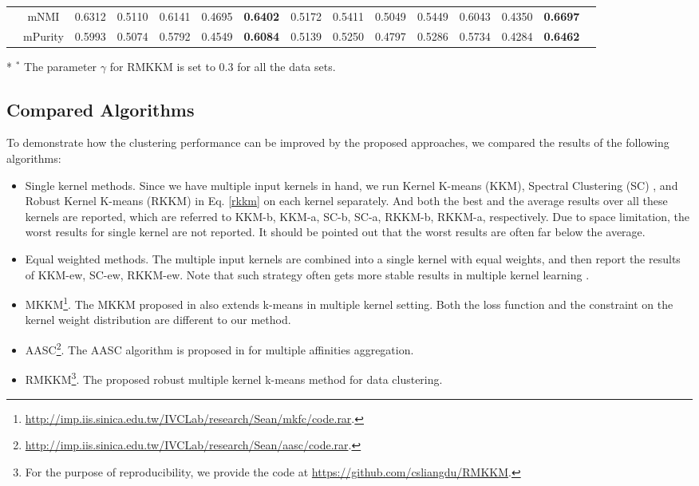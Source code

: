 \documentclass{article}
\begin{document}
\begin{table}[!htb]
\begin{tabular}{l c c c c c c c c c c c c c c}
		& mNMI & 0.6312&0.5110&0.6141&0.4695&\textbf{0.6402}&0.5172&0.5411&0.5049&0.5449&0.6043&0.4350&\textbf{0.6697}\\
		& mPurity & 0.5993&0.5074&0.5792&0.4549&\textbf{0.6084}&0.5139&0.5250&0.4797&0.5286&0.5734&0.4284&\textbf{0.6462}\\
		\bottomrule
\end{tabular}
\begin{tablenotes}
\item[*] $^*$ The parameter $\gamma$ for RMKKM is set to $0.3$ for all the data sets.
\end{tablenotes}
\end{table}

\subsection{Compared Algorithms}
To demonstrate how the clustering performance can be improved by the proposed approaches, we compared the results of the following algorithms:
\begin{itemize}
  \item Single kernel methods. Since we have multiple input kernels in hand, we run Kernel K-means (KKM), Spectral Clustering (SC) \cite{ng2002spectral}, and Robust Kernel K-means (RKKM) in Eq. \eqref{rkkm} on each kernel separately. And both the best and the average results over all these kernels are reported, which are referred to KKM-b, KKM-a, SC-b, SC-a, RKKM-b, RKKM-a, respectively. Due to space limitation, the worst results for single kernel are not reported. It should be pointed out that the worst results are often far below the average.
  \item Equal weighted methods. The multiple input kernels are combined into a single kernel with equal weights, and then report the results of KKM-ew, SC-ew, RKKM-ew. Note that such strategy often gets more stable results in multiple kernel learning \cite{gonen2011multiple}.
  \item MKKM\footnote{\url{http://imp.iis.sinica.edu.tw/IVCLab/research/Sean/mkfc/code.rar}.}.
  The MKKM proposed in \cite{huang2012multiple} also extends k-means in multiple kernel setting. Both the loss function and the constraint on the kernel weight distribution are different to our method.
  \item AASC\footnote{\url{http://imp.iis.sinica.edu.tw/IVCLab/research/Sean/aasc/code.rar}.}.
  The AASC algorithm is proposed in \cite{huang2012affinity} for multiple affinities aggregation.
  \item RMKKM\footnote{For the purpose of reproducibility, we provide the code at \url{https://github.com/csliangdu/RMKKM}.}. The proposed robust multiple kernel k-means method for data clustering.
\end{itemize}
\end{document}
